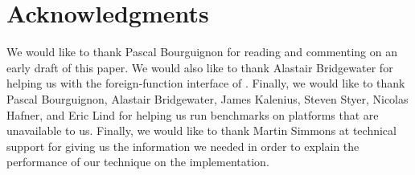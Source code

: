 \section{Acknowledgments}

We would like to thank Pascal Bourguignon for reading and commenting
on an early draft of this paper.  We would also like to thank Alastair
Bridgewater for helping us with the foreign-function interface of
\sbcl{}.  Finally, we would like to thank Pascal Bourguignon, Alastair
Bridgewater, James Kalenius, Steven Styer, Nicolas Hafner, and Eric
Lind for helping us run benchmarks on platforms that are unavailable
to us.  Finally, we would like to thank Martin Simmons at \lispworks{}
technical support for giving us the information we needed in order to
explain the performance of our technique on the \lispworks{}
\commonlisp{} implementation.
